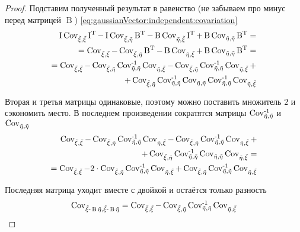 \begin{proof}
  Подставим полученный результат в равенство (не забываем про минус
  перед матрицей $\operatorname{B}$)
  \ref{eq:gaussianVector:independent:covariation}
  \begin{align*}
  \operatorname{I} \dCov{\vec{\xi}} \operatorname{I^T}
      - \operatorname{I} \Cov{\vec{\xi}}{\vec{\eta}} \operatorname{B^T}
      - \operatorname{B} \Cov{\vec{\eta}}{\vec{\xi}} \operatorname{I^T}
      + \operatorname{B} \dCov{\vec{\eta}} \operatorname{B^T} = \\
  = \dCov{\vec{\xi}}
      - \Cov{\vec{\xi}}{\vec{\eta}} \operatorname{B^T}
      - \operatorname{B} \Cov{\vec{\eta}}{\vec{\xi}}
      + \operatorname{B} \dCov{\vec{\eta}} \operatorname{B^T} = \\
  = \dCov{\vec{\xi}}
      - \Cov{\vec{\xi}}{\vec{\eta}}
      \dCov[-1]{\vec{\eta}} \Cov{\vec{\eta}}{\vec{\xi}}
      - \Cov{\vec{\xi}}{\vec{\eta}} \dCov[-1]{\vec{\eta}}
      \Cov{\vec{\eta}}{\vec{\xi}} + \\
      + \Cov{\vec{\xi}}{\vec{\eta}} \dCov[-1]{\vec{\eta}}
      \dCov{\vec{\eta}} \dCov[-1]{\vec{\eta}} \Cov{\vec{\eta}}{\vec{\xi}}
  \end{align*}

  Вторая и третья матрицы одинаковые, поэтому можно поставить множитель $2$ и
  сэкономить место. В последнем произведении сократятся матрицы
  $\dCov[-1]{\vec{\eta}}$ и $\dCov{\vec{\eta}}$
  \begin{align*}
      \dCov{\vec{\xi}}
      - \Cov{\vec{\xi}}{\vec{\eta}}
          \dCov[-1]{\vec{\eta}} \Cov{\vec{\eta}}{\vec{\xi}}
      - \Cov{\vec{\xi}}{\vec{\eta}} \dCov[-1]{\vec{\eta}}
          \Cov{\vec{\eta}}{\vec{\xi}} + \\
      + \Cov{\vec{\xi}}{\vec{\eta}} \dCov[-1]{\vec{\eta}}
          \dCov{\vec{\eta}} \Cov{\vec{\eta}}{\vec{\xi}} = \\
      = \dCov{\vec{\xi}}
      - 2 \cdot \Cov{\vec{\xi}}{\vec{\eta}}
          \dCov[-1]{\vec{\eta}} \Cov{\vec{\eta}}{\vec{\xi}}
      + \Cov{\vec{\xi}}{\vec{\eta}} \dCov[-1]{\vec{\eta}}
          \Cov{\vec{\eta}}{\vec{\xi}}
  \end{align*}

  Последняя матрица уходит вместе с двойкой и остаётся только разность
  \begin{align*}
      \dCov{\vec{\xi} - \operatorname{B} \vec{\eta}}
      = \dCov{\vec{\xi}} - \Cov{\vec{\xi}}{\vec{\eta}}
      \dCov[-1]{\vec{\eta}} \Cov{\vec{\eta}}{\vec{\xi}}
  \end{align*}


\end{proof}
